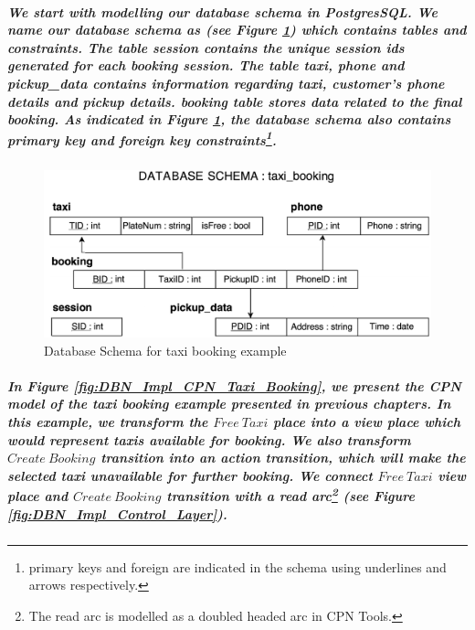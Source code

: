 \subparagraph*{\textnormal{We start with modelling our database schema in PostgresSQL. We name our database schema as  (see Figure \ref{fig:DBN_Impl_Persistence_Layer}) which contains tables and constraints. The table \textit{session} contains the unique session ids generated for each booking session. The table \textit{taxi}, \textit{phone} and \textit{pickup\_data} contains information regarding taxi, customer's phone details and pickup details. \textit{booking} table stores data related to the final booking. As indicated in Figure \ref{fig:DBN_Impl_Persistence_Layer}, the database schema also contains primary key and foreign key constraints\footnote{primary keys and foreign are indicated in the schema using underlines and arrows respectively.}.}}

\begin{figure}[!htbp]
	\centering
	\includegraphics[scale = 0.45]{DBN_Impl_Persistence_Layer.pdf}
	\caption{Database Schema for taxi booking example}
	\label{fig:DBN_Impl_Persistence_Layer}
\end{figure}

\subparagraph*{\textnormal{In Figure \ref{fig:DBN_Impl_CPN_Taxi_Booking}, we present the CPN model of the taxi booking example presented in previous chapters. In this example, we transform the $\mathit{Free\ Taxi}$ place into a view place which would represent taxis available for booking. We also transform $\mathit{Create\ Booking}$ transition into an action transition, which will make the selected taxi unavailable for further booking. We connect $\mathit{Free\ Taxi}$ view place and $\mathit{Create\ Booking}$ transition with a read arc\footnote{The read arc is modelled as a doubled headed arc in CPN Tools.} (see Figure \ref{fig:DBN_Impl_Control_Layer}).}}

